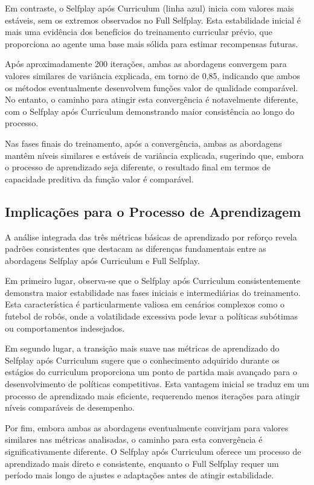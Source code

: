 Em contraste, o Selfplay após Curriculum (linha azul) inicia com valores mais estáveis, sem os extremos observados no Full Selfplay. Esta estabilidade inicial é mais uma evidência dos benefícios do treinamento curricular prévio, que proporciona ao agente uma base mais sólida para estimar recompensas futuras.

Após aproximadamente 200 iterações, ambas as abordagens convergem para valores similares de variância explicada, em torno de 0,85, indicando que ambos os métodos eventualmente desenvolvem funções valor de qualidade comparável. No entanto, o caminho para atingir esta convergência é notavelmente diferente, com o Selfplay após Curriculum demonstrando maior consistência ao longo do processo.

Nas fases finais do treinamento, após a convergência, ambas as abordagens mantêm níveis similares e estáveis de variância explicada, sugerindo que, embora o processo de aprendizado seja diferente, o resultado final em termos de capacidade preditiva da função valor é comparável.

\subsection{Implicações para o Processo de Aprendizagem}

A análise integrada das três métricas básicas de aprendizado por reforço revela padrões consistentes que destacam as diferenças fundamentais entre as abordagens Selfplay após Curriculum e Full Selfplay.

Em primeiro lugar, observa-se que o Selfplay após Curriculum consistentemente demonstra maior estabilidade nas fases iniciais e intermediárias do treinamento. Esta característica é particularmente valiosa em cenários complexos como o futebol de robôs, onde a volatilidade excessiva pode levar a políticas subótimas ou comportamentos indesejados.

Em segundo lugar, a transição mais suave nas métricas de aprendizado do Selfplay após Curriculum sugere que o conhecimento adquirido durante os estágios do curriculum proporciona um ponto de partida mais avançado para o desenvolvimento de políticas competitivas. Esta vantagem inicial se traduz em um processo de aprendizado mais eficiente, requerendo menos iterações para atingir níveis comparáveis de desempenho.

Por fim, embora ambas as abordagens eventualmente convirjam para valores similares nas métricas analisadas, o caminho para esta convergência é significativamente diferente. O Selfplay após Curriculum oferece um processo de aprendizado mais direto e consistente, enquanto o Full Selfplay requer um período mais longo de ajustes e adaptações antes de atingir estabilidade.

